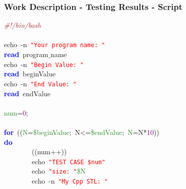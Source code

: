 \documentclass[table, usenames,dvipsnames,svgnames]{beamer}
\begin{document}
\begin{frame}

\frametitle{Work Description - Testing Results - Script}




\pause
\vspace{-4mm}
\begin{center}\begin{minipage}{110mm}
\begin{block}
\noindent
\mbox{}\textit{\textcolor{Brown}{\#!/bin/bash}} \\
\mbox{} \\
\mbox{}echo\ -n\ \texttt{\textcolor{Red}{"{}Your\ program\ name:\ "{}}} \\
\mbox{}\textbf{\textcolor{Blue}{read}}\ program$\_$name \\
\mbox{}echo\ -n\ \texttt{\textcolor{Red}{"{}Begin\ Value:\ "{}}} \\
\mbox{}\textbf{\textcolor{Blue}{read}}\ beginValue \\
\mbox{}echo\ -n\ \texttt{\textcolor{Red}{"{}End\ Value:\ "{}}} \\
\mbox{}\textbf{\textcolor{Blue}{read}}\ endValue \\
\mbox{} \\
\mbox{}\textcolor{ForestGreen}{num}\textcolor{BrickRed}{=}\textcolor{Purple}{0}\textcolor{BrickRed}{;} \\
\mbox{} \\
\mbox{}\textbf{\textcolor{Blue}{for}}\ \textcolor{BrickRed}{((}\textcolor{ForestGreen}{N}\textcolor{BrickRed}{=}\textcolor{ForestGreen}{\$beginValue}\textcolor{BrickRed}{;}\ N\textcolor{BrickRed}{\textless{}=}\textcolor{ForestGreen}{\$endValue}\textcolor{BrickRed}{;}\ \textcolor{ForestGreen}{N}\textcolor{BrickRed}{=}N\textcolor{BrickRed}{*}\textcolor{Purple}{10}\textcolor{BrickRed}{))} \\
\mbox{}\textbf{\textcolor{Blue}{do}} \\
\mbox{}\ \ \ \ \ \ \ \ \textcolor{BrickRed}{((}num\textcolor{BrickRed}{++))} \\
\mbox{}\ \ \ \ \ \ \ \ echo\ \texttt{\textcolor{Red}{"{}TEST\ CASE\ \$num"{}}} \\
\mbox{}\ \ \ \ \ \ \ \ echo\ \texttt{\textcolor{Red}{"{}size:\ "{}}}\textcolor{ForestGreen}{\$N} \\
\mbox{}\ \ \ \ \ \ \ \ echo\ -n\ \texttt{\textcolor{Red}{"{}My\ Cpp\ STL:\ "{}}} \\

\end{block}
\end{minipage}
\end{center}
\end{frame}
\end{document}
